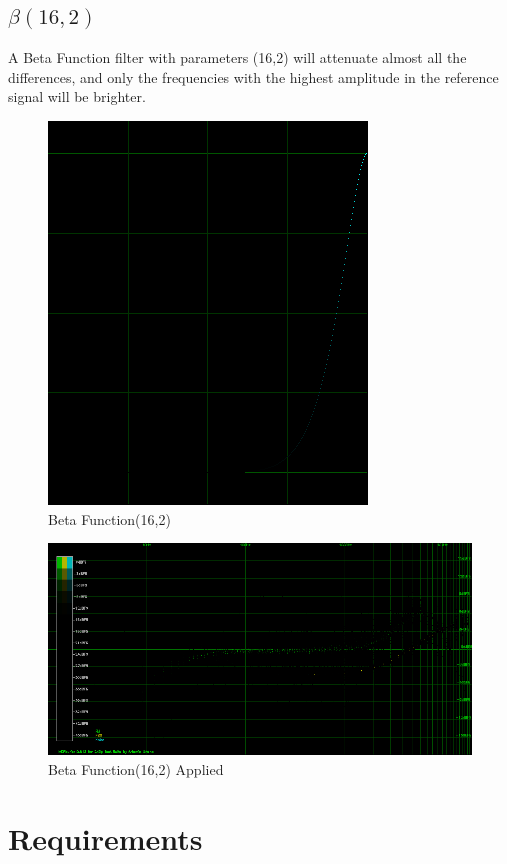 \documentclass[10pt,a4paper]{report}
\begin{document}
\begin{appendices}
\section{$\beta(16,2)$} 

A Beta Function filter with parameters (16,2) will attenuate almost all the differences, and only the frequencies with the highest amplitude in the reference signal will be brighter.

\begin{figure}[H]
	\centering
	\includegraphics[width=0.4\linewidth]{images/colorfilter/BetaFunctionPlot_5.png}
	\caption[Beta Function(16,2)]{Beta Function(16,2)}
	\label{fig:betafunctionplot5}
\end{figure}

\begin{figure}[H]
	\centering
	\includegraphics[width=1\linewidth]{images/colorfilter/BetaFunctionPlot_5_Data.png}
	\caption[Beta Function(16,2)]{Beta Function(16,2) Applied}
	\label{fig:betafunctionplot5data}
\end{figure}

\chapter{Requirements}
\label{requirements}

\end{appendices}
\end{document}

